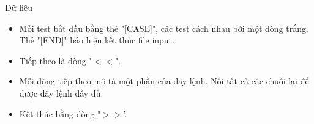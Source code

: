Dữ liệu
\begin{itemize}
	\item     Mỗi test bắt đầu bằng thẻ "[CASE]", các test cách nhau bởi một dòng trắng. Thẻ "[END]" báo hiệu kết thúc file input.   
	\item     Tiếp theo là dòng "$<$$<$".   
	\item     Mỗi dòng tiếp theo mô tả một phần của dãy lệnh. Nối tất cả các chuỗi lại để được dãy lệnh đầy đủ.   
	\item     Kết thúc bằng dòng "$>$$>$'.   
\end{itemize}